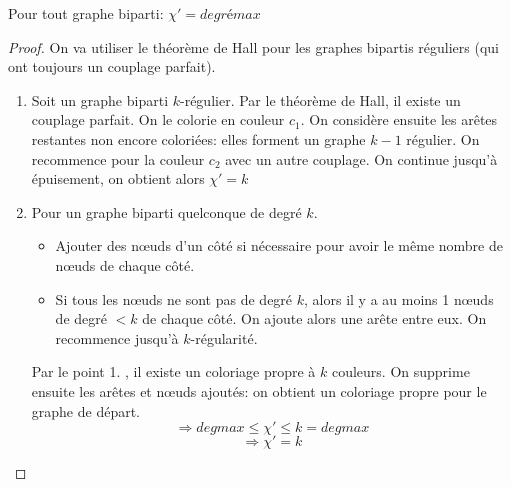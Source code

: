 \begin{mytheo}[König]
  Pour tout graphe biparti: $\chi '= degré max$
  \begin{proof}
    On va utiliser le théorème de Hall pour les graphes bipartis réguliers (qui ont toujours un couplage parfait).
    \begin{enumerate}


    \item Soit un graphe biparti $k$-régulier. Par le théorème de Hall, il existe un couplage parfait. On le colorie en couleur $c_{1}$. On considère ensuite les arêtes restantes non encore coloriées: elles forment un graphe $k-1$ régulier. On recommence pour la couleur $c_{2}$ avec un autre couplage. On continue jusqu'à épuisement, on obtient alors $\chi '=k$
    \item Pour un graphe biparti quelconque de degré $k$.
    \begin{itemize}
    \item Ajouter des nœuds d'un côté si nécessaire pour avoir le même nombre de nœuds de chaque côté.
    \item Si tous les nœuds ne sont pas de degré $k$, alors il y a au moins 1 nœuds de degré $<k$ de chaque côté. On ajoute alors une arête entre eux. On recommence jusqu'à $k$-régularité.
    \end{itemize}
    Par le point 1. , il existe un coloriage propre à $k$ couleurs. On supprime ensuite les arêtes et nœuds ajoutés: on obtient un coloriage propre pour le graphe de départ.
    $$\Rightarrow deg max \le \chi ' \le k=deg max$$
    $$\Rightarrow \chi ' = k$$
    \end{enumerate}
  \end{proof}
\end{mytheo}

